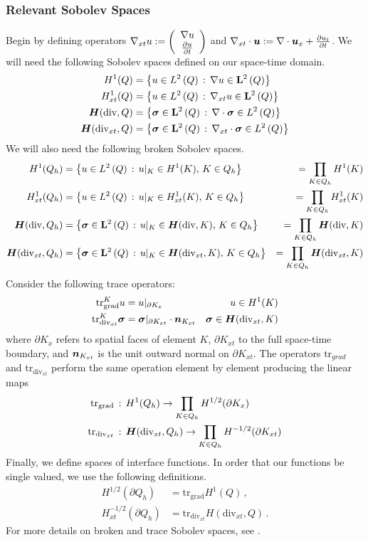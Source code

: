 \documentclass{article}
\begin{document}
\subsubsection{Relevant Sobolev Spaces}
Begin by defining operators $\nabla_{xt} u:=\left( \begin{array}{c} \nabla u\\ \frac{\partial u}{\partial t}\\ \end{array} \right)$ and $\nabla_{xt}\cdot\boldsymbol u:=\nabla\cdot\boldsymbol u_x+\frac{\partial u_t}{\partial t}$.
We will need the following Sobolev spaces defined on our space-time domain.
\begin{align*}
H^{1}(Q)&=\left\{ u\in L^2\left( Q \right)\,:\,\nabla u\in\mathbf{L}^2\left( Q \right) \right\}\\
H^1_{xt}(Q)&=\left\{ u\in L^2\left( Q \right)\,:\,\nabla_{xt} u\in\mathbf{L}^2\left( Q \right) \right\}\\
\mbox{\boldmath $H$}(\text{div},Q)&=\left\{ \boldsymbol\sigma\in\mathbf{L}^2\left( Q \right)\,:\,\nabla\cdot\boldsymbol\sigma\in L^2\left( Q \right) \right\}\\
\mbox{\boldmath $H$}(\text{div}_{xt},Q)&=\left\{ \boldsymbol\sigma\in\mathbf{L}^2\left( Q \right)\,:\,\nabla_{xt}\cdot\boldsymbol\sigma\in L^2\left( Q \right) \right\}\\
\end{align*}
We will also need the following broken Sobolev spaces.
\begin{align*}
H^1(Q_h)&=\left\{ u\in L^2\left( Q \right)\,:\,u|_K\in H^{1}(K),\,K\in Q_h \right\}&=\prod_{K\in Q_h}H^1(K)\\
H^1_{xt}(Q_h)&=\left\{ u\in L^2\left( Q \right)\,:\,u|_K\in H^1_{xt}(K),\,K\in Q_h \right\}&=\prod_{K\in Q_h}H^1_{xt}(K)\\
\mbox{\boldmath $H$}(\text{div},Q_h)&=\left\{ \boldsymbol\sigma\in\mathbf{L}^2\left( Q \right)\,:\,u|_K\in\mbox{\boldmath $H$}(\text{div},K),\,K\in Q_h \right\}&=\prod_{K\in Q_h}\mbox{\boldmath $H$}(\text{div},K)\\
\mbox{\boldmath $H$}(\text{div}_{xt},Q_h)&=\left\{ \boldsymbol\sigma\in\mathbf{L}^2\left( Q \right)\,:\,u|_K\in\mbox{\boldmath $H$}(\text{div}_{xt},K),\,K\in Q_h \right\}&=\prod_{K\in Q_h}\mbox{\boldmath $H$}(\text{div}_{xt},K)
\end{align*}
Consider the following trace operators:
\begin{align*}
\text{tr}^K_\text{grad} u&=u|_{\partial K_x} & u\in H^1(K)\\
\text{tr}^K_{\text{div}_{xt}} \boldsymbol\sigma&=\boldsymbol\sigma|_{\partial K_{xt}}\cdot\boldsymbol n_{K_{xt}} & \boldsymbol\sigma\in \mbox{\boldmath $H$}(\text{div}_{xt},K)
\end{align*}
where $\partial K_x$ refers to spatial faces of element $K$, $\partial K_{xt}$ to the full space-time boundary, and $\boldsymbol n_{K_{xt}}$ is the unit outward normal on $\partial K_{xt}$.
The operators $\text{tr}_{grad}$ and $\text{tr}_{\text{div}_{xt}}$ perform the same operation element by element producing the linear maps
\begin{align*}
\text{tr}_{\text{grad}}&\,:\,H^1(Q_h)\rightarrow\prod_{K\in Q_h}H^{1/2}(\partial K_x)\\
\text{tr}_{\text{div}_{xt}}&\,:\,\mbox{\boldmath $H$}(\text{div}_{xt},Q_h)\rightarrow\prod_{K\in Q_h}H^{-1/2}(\partial K_{xt})
\end{align*}
Finally, we define spaces of interface functions.
In order that our functions be single valued, we use the following definitions.
\begin{align*}
H^{1/2}(\partial Q_h)&=\text{tr}_{\text{grad}}H^{1}(Q)\,,\\
H^{-1/2}_{xt}(\partial Q_h)&=\text{tr}_{\text{div}_{xt}}H(\text{div}_{xt},Q)\,.
\end{align*}
For more details on broken and trace Sobolev spaces, see \cite{BreakingSpaces}.
\end{document}
